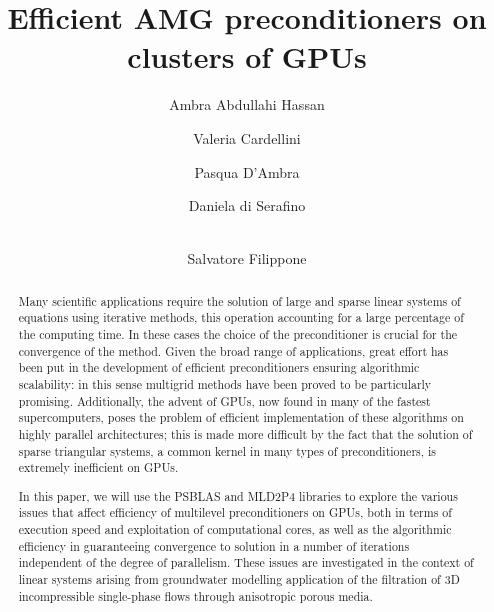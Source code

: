 \documentclass[runningheads,a4paper]{llncs}
\newcommand{\keywords}[1]{\par\addvspace\baselineskip
\noindent\keywordname\enspace\ignorespaces#1}
\begin{document}
\mainmatter  %

\title{Efficient AMG preconditioners on clusters of GPUs}



%
%
\author{Ambra Abdullahi Hassan%
\and Valeria Cardellini\and Pasqua D'Ambra\and Daniela di Serafino\and\\
Salvatore Filippone}
%



%
%

\maketitle


\begin{abstract}
Many scientific applications require the solution of large and sparse linear systems of equations using iterative methods, this operation accounting for a large percentage of the computing time. In these cases the choice of the preconditioner is crucial for the convergence of the method.
Given the broad range of applications, great effort has been put in the development of efficient  preconditioners ensuring algorithmic scalability: in this sense multigrid methods have been proved to be particularly promising.
Additionally, the advent of GPUs, now found in many of the fastest supercomputers, poses the problem of efficient implementation of these algorithms on highly parallel architectures; this is made more difficult by the fact that the solution of sparse triangular systems, a common kernel in many types of preconditioners, is extremely inefficient on GPUs. 

In this paper, we will use the PSBLAS and MLD2P4 libraries to explore the various issues that affect efficiency of multilevel preconditioners on GPUs, both in terms of execution speed and exploitation of computational cores, as well as the algorithmic efficiency in guaranteeing convergence to solution in a number of iterations independent of the degree of parallelism. These issues are investigated in the context of linear systems arising from groundwater modelling application of the filtration of 3D incompressible single-phase flows through anisotropic porous media.
\keywords{}
\end{abstract}
\end{document}
